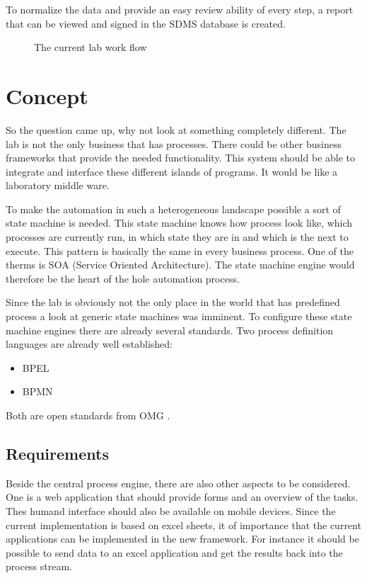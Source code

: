 \documentclass[paper=a4,twoside=false,BCOR=0mm,DIV=calc,fontsize=12pt]{scrartcl}
\begin{document}
To normalize the data and provide an easy review ability of every step, a report that can be viewed and signed in the SDMS database is created.

\begin{figure}
    \begin{center}
    \end{center}
  \caption{The current lab work flow}
  \label{CurrentLabWorkflow}
\end{figure} 




\section{Concept}
So the question came up, why not look at something completely different. The lab is not the only business that has processes. There could be other business frameworks that provide the needed functionality. This system should be able to integrate and interface these different islands of programs. It would be like a laboratory middle ware.

To make the automation in such a heterogeneous landscape possible a sort of state machine is needed. This state machine knows how process
look like, which processes are currently run, in which state they are in and which is the next to execute.
This pattern is basically the same in every business process. One of the therms is SOA (Service Oriented Architecture). The state machine engine would therefore be the heart of the hole automation process.

Since the lab is obviously not the only place in the world that has predefined process a look at generic state machines was imminent.
To configure these state  machine engines there are already several standards. Two process definition languages are already well established:

\begin{itemize}
 \item BPEL
 \item BPMN
\end{itemize}

Both are open standards from OMG \cite{omg}.


\subsection{Requirements}
Beside the central process engine, there are also other aspects to be considered. One is a web application that should provide forms and an overview
of the tasks. Thes humand interface should also be available on mobile devices.
Since the current implementation is based on excel sheets, it of importance that the current applications can be implemented in the new framework.
For instance it should be possible to send data to an excel application and get the results back into the process stream.
\end{document}
